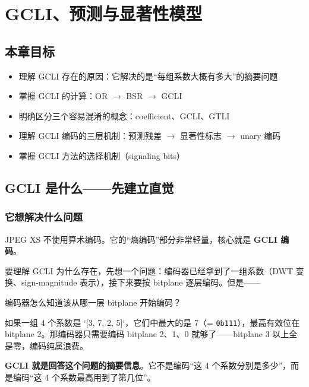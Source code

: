 
\chapter{GCLI、预测与显著性模型}\label{ch:gcli}

\section{本章目标}

\begin{itemize}
  \item 理解 GCLI 存在的原因：它解决的是``每组系数大概有多大''的摘要问题
  \item 掌握 GCLI 的计算：OR $\to$ BSR $\to$ GCLI
  \item 明确区分三个容易混淆的概念：coefficient、GCLI、GTLI
  \item 理解 GCLI 编码的三层机制：预测残差 $\to$ 显著性标志 $\to$ unary 编码
  \item 掌握 GCLI 方法的选择机制（signaling bits）
\end{itemize}

\section{GCLI 是什么——先建立直觉}

\subsection{它想解决什么问题}

JPEG XS 不使用算术编码。它的``熵编码''部分非常轻量，核心就是 \textbf{GCLI 编码}。

要理解 GCLI 为什么存在，先想一个问题：编码器已经拿到了一组系数（DWT 变换、sign-magnitude 表示），接下来要按 bitplane 逐层编码。但是——

\begin{tcolorbox}[colback=yellow!5,colframe=yellow!60!black,title=核心问题]
编码器怎么知道该从哪一层 bitplane 开始编码？
\end{tcolorbox}

如果一组 4 个系数是 `[3, 7, 2, 5]`，它们中最大的是 7（= \texttt{0b111}），最高有效位在 bitplane 2。那编码器只需要编码 bitplane 2、1、0 就够了——bitplane 3 以上全是零，编码纯属浪费。

\textbf{GCLI 就是回答这个问题的摘要信息}。它不是编码``这 4 个系数分别是多少''，而是编码``这 4 个系数最高用到了第几位''。


